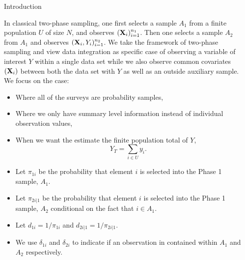 \documentclass[final]{beamer}
\newlength{\sepwidth}
\newlength{\colwidth}
\newcommand{\separatorcolumn}{\begin{column}{\sepwidth}\end{column}}
\begin{document}
\begin{frame}[t]
\begin{columns}[t]
\separatorcolumn

\begin{column}{\colwidth}

  \begin{block}{Introduction}

    In classical two-phase sampling, one first selects a sample $A_1$ from a
    finite population $U$ of size $N$, and observes $({\bf X}_i)_{i = 1}^{n_1}$.
    Then one selects a sample $A_2$ from $A_1$ and observes 
    $({\bf X}_i, Y_i)_{i = 1}^{n_2}$. We take the
    framework of two-phase sampling and view data integration as specific case
    of observing a variable of interest $Y$ within a single data set while we
    also observe common covariates $({\bf X}_i)$ between both the data set with
    $Y$ as well as an outside auxiliary sample. 
    We focus on the case:

    \begin{itemize}
      \item Where all of the surveys are probability samples, 
      \item Where we only have summary level information instead of individual
        observation values,
      \item When we want the estimate the finite population total of $Y$,
        $$Y_T = \sum_{i \in U} y_i.$$
    \end{itemize}

    \vspace{-0.3cm}

    \begin{itemize}
      \item Let $\pi_{1i}$ be the probability that element $i$ is selected into
        the Phase 1 sample, $A_1$.
      \item Let $\pi_{2i|1}$ be the probability that element $i$ is selected into
        the Phase 1 sample, $A_2$ conditional on the fact that $i \in A_1$.
      \item Let $d_{1i} = 1 / \pi_{1i}$ and $d_{2i|1} = 1 / \pi_{2i|1}$.
      \item We use $\delta_{1i}$ and $\delta_{2i}$ to indicate if an observation
        in contained within $A_1$ and $A_2$ respectively.
    \end{itemize}


\end{block}
\end{column}
\end{columns}
\end{frame}
\end{document}
